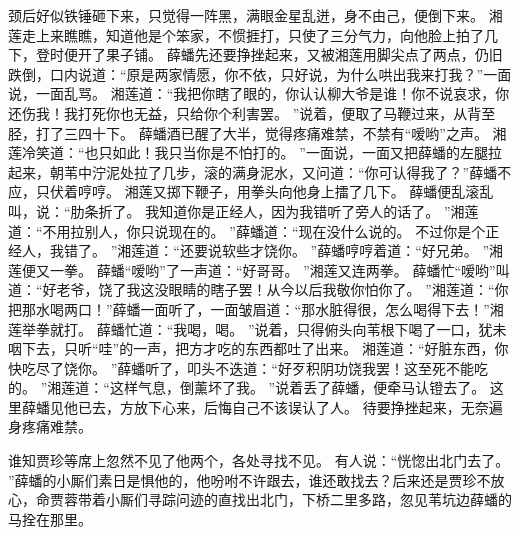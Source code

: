 颈后好似铁锤砸下来，只觉得一阵黑，满眼金星乱迸，身不由己，便倒下来。
湘莲走上来瞧瞧，知道他是个笨家，不惯捱打，只使了三分气力，向他脸上拍了几下，登时便开了果子铺。
薛蟠先还要挣挫起来，又被湘莲用脚尖点了两点，仍旧跌倒，口内说道：“原是两家情愿，你不依，只好说，为什么哄出我来打我？”一面说，一面乱骂。
湘莲道：“我把你瞎了眼的，你认认柳大爷是谁！你不说哀求，你还伤我！我打死你也无益，只给你个利害罢。
”说着，便取了马鞭过来，从背至胫，打了三四十下。
薛蟠酒已醒了大半，觉得疼痛难禁，不禁有“嗳哟”之声。
湘莲冷笑道：“也只如此！我只当你是不怕打的。
”一面说，一面又把薛蟠的左腿拉起来，朝苇中泞泥处拉了几步，滚的满身泥水，又问道：“你可认得我了？”薛蟠不应，只伏着哼哼。
湘莲又掷下鞭子，用拳头向他身上擂了几下。
薛蟠便乱滚乱叫，说：“肋条折了。
我知道你是正经人，因为我错听了旁人的话了。
”湘莲道：“不用拉别人，你只说现在的。
”薛蟠道：“现在没什么说的。
不过你是个正经人，我错了。
”湘莲道：“还要说软些才饶你。
”薛蟠哼哼着道：“好兄弟。
”湘莲便又一拳。
薛蟠“嗳哟”了一声道：“好哥哥。
”湘莲又连两拳。
薛蟠忙“嗳哟”叫道：“好老爷，饶了我这没眼睛的瞎子罢！从今以后我敬你怕你了。
”湘莲道：“你把那水喝两口！”薛蟠一面听了，一面皱眉道：“那水脏得很，怎么喝得下去！”湘莲举拳就打。
薛蟠忙道：“我喝，喝。
”说着，只得俯头向苇根下喝了一口，犹未咽下去，只听“哇”的一声，把方才吃的东西都吐了出来。
湘莲道：“好脏东西，你快吃尽了饶你。
”薛蟠听了，叩头不迭道：“好歹积阴功饶我罢！这至死不能吃的。
”湘莲道：“这样气息，倒薰坏了我。
”说着丢了薛蟠，便牵马认镫去了。
这里薛蟠见他已去，方放下心来，后悔自己不该误认了人。
待要挣挫起来，无奈遍身疼痛难禁。
\par
谁知贾珍等席上忽然不见了他两个，各处寻找不见。
有人说：“恍惚出北门去了。
”薛蟠的小厮们素日是惧他的，他吩咐不许跟去，谁还敢找去？后来还是贾珍不放心，命贾蓉带着小厮们寻踪问迹的直找出北门，下桥二里多路，忽见苇坑边薛蟠的马拴在那里。
